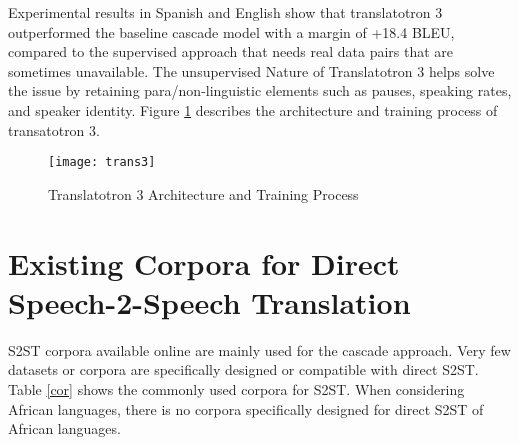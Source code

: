 \documentclass[12pt]{article}
\begin{document}
Experimental results in Spanish and English show that translatotron 3 outperformed the baseline cascade model with a margin of +18.4 BLEU, compared to the supervised approach that needs real data pairs that are sometimes unavailable. The unsupervised Nature of Translatotron 3 helps solve the issue by retaining para/non-linguistic elements such as pauses, speaking rates, and speaker identity. Figure \ref{trans3} describes the architecture and training process of transatotron 3.

\begin{figure}[H]
    \centering
    \texttt{[image: trans3]} 
    \caption{Translatotron 3 Architecture and Training Process \cite{nachmani}}
    \label{trans3}
\end{figure}

\section{Existing Corpora for Direct Speech-2-Speech Translation}

S2ST corpora available online are mainly used for the cascade approach.
Very few datasets or corpora are specifically designed or compatible with direct S2ST. Table \ref{cor} shows the commonly used corpora for S2ST. When considering African languages, there is no corpora specifically designed for direct S2ST of African languages.

\begin{table}[H]

\centering
\caption{Speech-to-Speech Translation Datasets}
\vspace{10pt}
\renewcommand{\arraystretch}{1.5} 
\label{cor}
\end{table}
\end{document}
